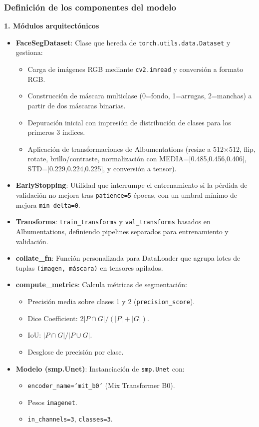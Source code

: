 \subsubsection{Definición de los componentes del modelo}
\textbf{1. Módulos arquitectónicos}
\begin{itemize}
  \item \textbf{FaceSegDataset}: Clase que hereda de \texttt{torch.utils.data.Dataset} y gestiona:
    \begin{itemize}
      \item Carga de imágenes RGB mediante \texttt{cv2.imread} y conversión a formato RGB.
      \item Construcción de máscara multiclase (0=fondo, 1=arrugas, 2=manchas) a partir de dos máscaras binarias.
      \item Depuración inicial con impresión de distribución de clases para los primeros 3 índices.
      \item Aplicación de transformaciones de Albumentations (resize a 512×512, flip, rotate, brillo/contraste, normalización con MEDIA=[0.485,0.456,0.406], STD=[0.229,0.224,0.225], y conversión a tensor).
    \end{itemize}

  \item \textbf{EarlyStopping}: Utilidad que interrumpe el entrenamiento si la pérdida de validación no mejora tras \texttt{patience=5} épocas, con un umbral mínimo de mejora \texttt{min\_delta=0}.

  \item \textbf{Transforms}:  
    \texttt{train\_transforms} y \texttt{val\_transforms} basados en Albumentations, definiendo pipelines separados para entrenamiento y validación.

  \item \textbf{collate\_fn}: Función personalizada para DataLoader que agrupa lotes de tuplas \texttt{(imagen, máscara)} en tensores apilados.

  \item \textbf{compute\_metrics}: Calcula métricas de segmentación:
    \begin{itemize}
      \item Precisión media sobre clases 1 y 2 (\texttt{precision\_score}).
      \item Dice Coefficient: $2|P\cap G|/(|P|+|G|)$.
      \item IoU: $|P\cap G|/|P\cup G|$.
      \item Desglose de precisión por clase.
    \end{itemize}

  \item \textbf{Modelo (smp.Unet)}:  
    Instanciación de \texttt{smp.Unet} con:
    \begin{itemize}
      \item \texttt{encoder\_name='mit\_b0'} (Mix Transformer B0).
      \item Pesos \texttt{imagenet}.
      \item \texttt{in\_channels=3}, \texttt{classes=3}.
    \end{itemize}
\end{itemize}

